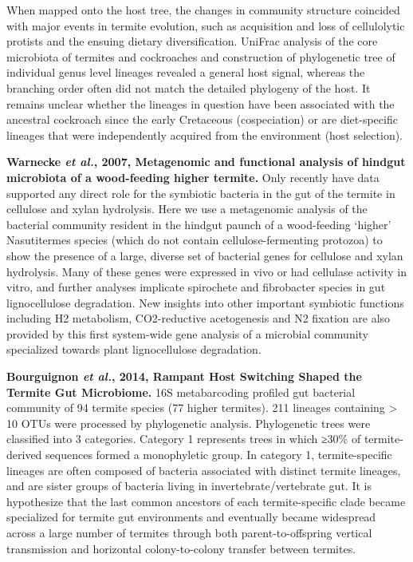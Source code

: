 \documentclass[11pt]{article}
\begin{document}
\begin{sloppypar}
When mapped onto the host tree, the changes in community structure coincided with major events in termite evolution, such as acquisition and loss of cellulolytic protists and the ensuing dietary diversification. 
UniFrac analysis of the core microbiota of termites and cockroaches and construction of phylogenetic tree of individual genus level lineages revealed a general host signal, whereas the branching order often did not match the detailed phylogeny of the host. 
It remains unclear whether the lineages in question have been associated with the ancestral cockroach since the early Cretaceous (cospeciation) or are diet-specific lineages that were independently acquired from the environment (host selection).
\par
\textbf{Warnecke \textit{et al.}, 2007, Metagenomic and functional analysis of hindgut microbiota of a wood-feeding higher termite.} \newline
Only recently have data supported any direct role for the symbiotic bacteria in the gut of the termite in cellulose and xylan hydrolysis. 
Here we use a metagenomic analysis of the bacterial community resident in the hindgut paunch of a wood-feeding ‘higher’ Nasutitermes species (which do not contain cellulose-fermenting protozoa) to show the presence of a large, diverse set of bacterial genes for cellulose and xylan hydrolysis. 
Many of these genes were expressed in vivo or had cellulase activity in vitro, and further analyses implicate spirochete and fibrobacter species in gut lignocellulose degradation. 
New insights into other important symbiotic functions including H2 metabolism, CO2-reductive acetogenesis and N2 fixation are also provided by this first system-wide gene analysis of a microbial community specialized towards plant lignocellulose degradation.
\par
\textbf{Bourguignon \textit{et al.}, 2014, Rampant Host Switching Shaped the Termite Gut Microbiome.} \newline
16S metabarcoding profiled gut bacterial community of 94 termite species (77 higher termites). 
211 lineages containing > 10 OTUs were processed by phylogenetic analysis. 
Phylogenetic trees were classified into 3 categories. 
Category 1 represents trees in which ≥30\% of termite-derived sequences formed a monophyletic group. 
In category 1, termite-specific lineages are often composed of bacteria associated with distinct termite lineages, and are sister groups of bacteria living in invertebrate/vertebrate gut. 
It is hypothesize that the last common ancestors of each termite-specific clade became specialized for termite gut environments and eventually became widespread across a large number of termites through both parent-to-offspring vertical transmission and horizontal colony-to-colony transfer between termites. 

\end{sloppypar}
\end{document}
